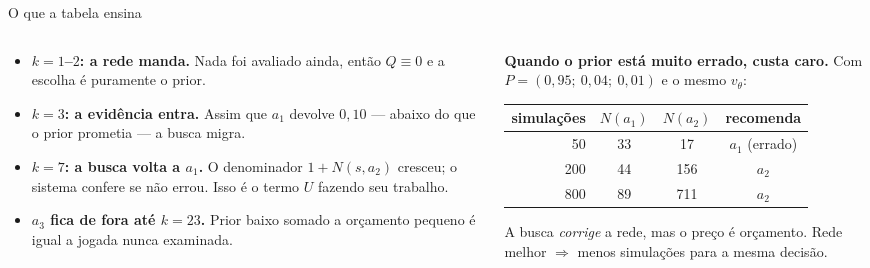\documentclass[aspectratio=169, 10pt]{beamer}
\newcommand{\Nvis}{N}
\newcommand{\redeval}{v_{\theta}}
\begin{document}
\begin{frame}{O que a tabela ensina}
  \small
  \begin{columns}[T]
    \begin{column}{0.49\textwidth}
      \begin{itemize}\setlength{\itemsep}{0.35em}
        \item \textbf{$k=1$--$2$: a rede manda.} Nada foi avaliado ainda, então
              $Q\equiv 0$ e a escolha é puramente o prior.
        \item \textbf{$k=3$: a evidência entra.} Assim que $a_1$ devolve
              $0{,}10$ — abaixo do que o prior prometia — a busca migra.
        \item \textbf{$k=7$: a busca volta a $a_1$.} O denominador
              $1+\Nvis(s,a_2)$ cresceu; o sistema confere se não errou. Isso é o
              termo $U$ fazendo seu trabalho.
        \item \textbf{$a_3$ fica de fora até $k=23$.} Prior baixo somado a
              orçamento pequeno é igual a jogada nunca examinada.
      \end{itemize}
    \end{column}
    \begin{column}{0.49\textwidth}
      \begin{alertabox}
        \textbf{Quando o prior está muito errado, custa caro.} Com
        $P = (0{,}95;\ 0{,}04;\ 0{,}01)$ e o mesmo $\redeval$:
        \smallskip
        \begin{center}\scriptsize
        \begin{tabular}{rccc}
          \toprule
          simulações & $\Nvis(a_1)$ & $\Nvis(a_2)$ & recomenda \\
          \midrule
          50  & 33 & 17  & \alert{$a_1$ (errado)} \\
          200 & 44 & 156 & $a_2$ \\
          800 & 89 & 711 & $a_2$ \\
          \bottomrule
        \end{tabular}
        \end{center}
        \smallskip
        A busca \emph{corrige} a rede, mas o preço é orçamento. Rede melhor
        $\Rightarrow$ menos simulações para a mesma decisão.
      \end{alertabox}
    \end{column}
  \end{columns}
\end{frame}
\end{document}
